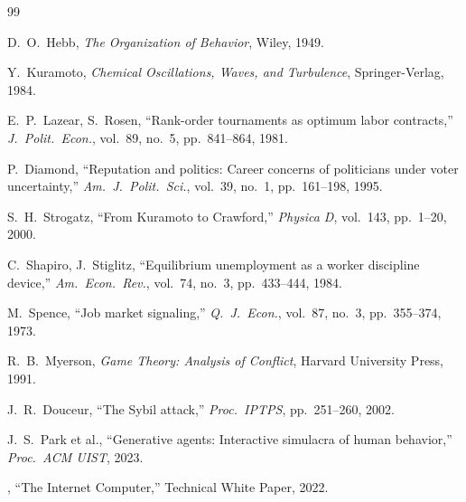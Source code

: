 \documentclass[12pt]{article}
\begin{document}
\begin{thebibliography}{99}

D.~O.~Hebb,
\emph{The Organization of Behavior},
Wiley, 1949.

Y.~Kuramoto,
\emph{Chemical Oscillations, Waves, and Turbulence},
Springer-Verlag, 1984.

E.~P.~Lazear, S.~Rosen,
``Rank-order tournaments as optimum labor contracts,''
\textit{J.\ Polit.\ Econ.}, vol.~89, no.~5, pp.~841--864, 1981.

P.~Diamond,
``Reputation and politics: Career concerns of politicians under voter
uncertainty,''
\textit{Am.\ J.\ Polit.\ Sci.}, vol.~39, no.~1, pp.~161--198, 1995.

S.~H.~Strogatz,
``From Kuramoto to Crawford,''
\textit{Physica D}, vol.~143, pp.~1--20, 2000.

C.~Shapiro, J.~Stiglitz,
``Equilibrium unemployment as a worker discipline device,''
\textit{Am.\ Econ.\ Rev.}, vol.~74, no.~3, pp.~433--444, 1984.

M.~Spence,
``Job market signaling,''
\textit{Q.\ J.\ Econ.}, vol.~87, no.~3, pp.~355--374, 1973.

R.~B.~Myerson,
\emph{Game Theory: Analysis of Conflict},
Harvard University Press, 1991.

J.~R.~Douceur,
``The Sybil attack,''
\textit{Proc.\ IPTPS}, pp.~251--260, 2002.

J.~S.~Park et al.,
``Generative agents: Interactive simulacra of human behavior,''
\textit{Proc.\ ACM UIST}, 2023.

,
``The Internet Computer,''
Technical White Paper, 2022.

\end{thebibliography}
\end{document}
